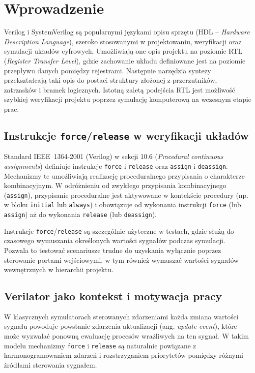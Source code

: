 \documentclass[shortabstract, inz]{iithesis}
\author         {Artur Bieniek}
\date          {5 lutego 2026}                     %
\begin{document}

\chapter{Wprowadzenie}

Verilog i SystemVerilog są popularnymi językami opisu sprzętu (HDL -- \textit{Hardware Description Language}), szeroko stosowanymi w projektowaniu, weryfikacji oraz symulacji układów cyfrowych. Umożliwiają one opis projektu na poziomie RTL (\textit{Register Transfer Level}), gdzie zachowanie układu definiowane jest na poziomie przepływu danych pomiędzy rejestrami. Następnie narzędzia syntezy przekształcają taki opis do postaci struktury złożonej z przerzutników, zatrzasków i bramek logicznych. Istotną zaletą podejścia RTL jest możliwość szybkiej weryfikacji projektu poprzez symulację komputerową na wczesnym etapie prac.

\section{Instrukcje \texttt{force}/\texttt{release} w weryfikacji układów}

Standard IEEE~1364-2001\cite{IEEE1364-2001} (Verilog) w sekcji 10.6 (\textit{Procedural continuous assignments}) definiuje instrukcje \texttt{force} i \texttt{release} oraz \texttt{assign} i \texttt{deassign}. Mechanizmy te umożliwiają realizację proceduralnego przypisania o charakterze kombinacyjnym. W odróżnieniu od zwykłego przypisania kombinacyjnego (\texttt{assign}), przypisanie proceduralne jest aktywowane w kontekście procedury (np. w bloku \texttt{initial} lub \texttt{always}) i obowiązuje od wykonania instrukcji \texttt{force} (lub \texttt{assign}) aż do wykonania \texttt{release} (lub \texttt{deassign}).

Instrukcje \texttt{force}/\texttt{release} są szczególnie użyteczne w testach, gdzie służą do czasowego wymuszania określonych wartości sygnałów podczas symulacji. Pozwala to testować scenariusze trudne do uzyskania wyłącznie poprzez sterowanie portami wejściowymi, w tym również wymuszać wartości sygnałów wewnętrznych w hierarchii projektu.

\section{Verilator jako kontekst i motywacja pracy}

W klasycznych symulatorach sterowanych zdarzeniami każda zmiana wartości sygnału powoduje powstanie zdarzenia aktualizacji (ang. \textit{update event}), które może wyzwalać ponowną ewaluację procesów wrażliwych na ten sygnał. W takim modelu mechanizmy \texttt{force} i \texttt{release} są naturalnie powiązane z harmonogramowaniem zdarzeń i rozstrzyganiem priorytetów pomiędzy różnymi źródłami sterowania sygnałem.
\end{document}
